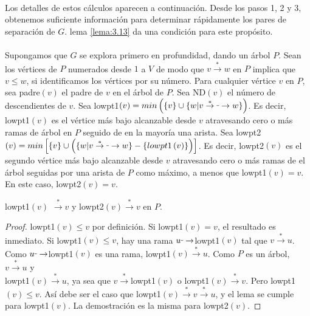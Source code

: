 \paragraph{}
Los detalles de estos cálculos aparecen a continuación. Desde los pasos 1, 2 y 3, obtenemos suficiente información para determinar rápidamente los pares de separación de $G$. lema \ref{lema:3.13} da una condición para este propósito.

\paragraph{}
Supongamos que $G$ se explora primero en profundidad, dando un árbol $P$. Sean los vértices de $P$ numerados desde $1$ a $V$ de modo que $v \overset{\ast}{\rightarrow} w$ en $P$ implica que $v \le w$, si identificamos los vértices por su número. Para cualquier vértice $v$ en $P$, sea padre$\left(v\right)$ el padre de $v$ en el árbol de $P$. Sea ND$\left(v\right)$ el número de descendientes de $v$. Sea lowpt1$\left(v\right) = min\left(\{v\} \cup \{w | v \overset{\ast}{\rightarrow} \rule[1mm]{.1cm}{0.4pt} \rightarrow w\}\right)$. Es decir, lowpt1$\left(v\right)$ es el vértice más bajo alcanzable desde $v$ atravesando cero o más ramas de árbol en $P$ seguido de en la mayoría una arista. Sea lowpt2$\left(v\right) = min\left[\{v\} \cup \left(\{w | v \overset{\ast}{\rightarrow} \rule[1mm]{.1cm}{0.4pt} \rightarrow w\} - \{lowpt1 \left(v\right)\}\right)\right]$. Es decir, lowpt2$\left(v\right)$ es el segundo vértice más bajo alcanzable desde $v$ atravesando cero o más ramas de el árbol seguidas por una arista de $P$ como máximo, a menos que lowpt1$\left(v\right) = v$. En este caso, lowpt2$\left(v\right) = v$.

\begin{lemma}
lowpt1$\left(v\right)$ $  \overset{\ast}{\rightarrow} v$ y lowpt2$\left(v\right) \overset{\ast}{\rightarrow}v$ en $P$.
\label{lema:3.5}
\end{lemma}

\begin{proof}
lowpt1$\left(v\right) \leq v$ por definición. Si lowpt1$\left(v\right) = v$, el resultado es inmediato. Si lowpt1$\left(v\right) \le v$, hay una rama $u \rule[1mm]{.1cm}{0.4pt} \rightarrow $lowpt1$(v)$ tal que $v \overset{\ast}{\rightarrow} u$. Como $u \rule[1mm]{.1cm}{0.4pt} \rightarrow $lowpt1$(v)$ es una rama, lowpt1$\left(v\right) \overset{\ast}{\rightarrow} u$. Como $P$ es un árbol, $v \overset{\ast}{\rightarrow} u$ y\\ lowpt1$\left(v\right) \overset{\ast}{\rightarrow} u$, ya sea que $v \overset{\ast}{\rightarrow} $lowpt1$\left(v\right)$ o lowpt1$\left(v\right) \overset{\ast}{\rightarrow} v$. Pero lowpt1$\left(v\right) \le v$. Así debe ser el caso que lowpt1$\left(v\right) \overset{\ast}{\rightarrow} v \overset{\ast}{\rightarrow} u$, y el lema se cumple para lowpt1$\left(v\right)$. La demostración es la misma para lowpt2$\left(v\right)$.
\end{proof}

